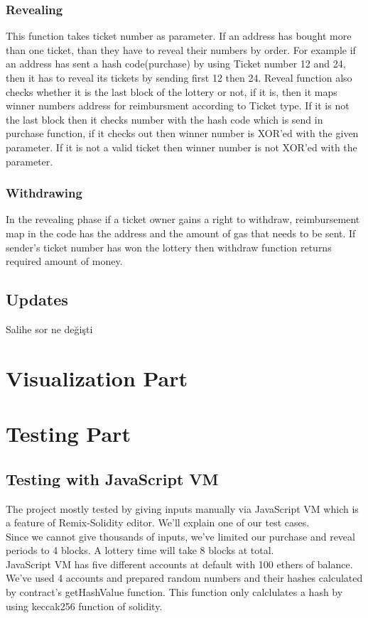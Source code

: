 \documentclass[]{scrreprt}
\begin{document}
		\subsection{Revealing}
		This function takes ticket number as parameter. If an address has bought more than one ticket, than they have to reveal their numbers by order. For example if an address has sent a hash code(purchase) by using Ticket number 12 and 24, then it has to reveal its tickets by sending first 12 then 24. Reveal function also checks whether it is the last block of the lottery or not, if it is, then it maps winner numbers address for reimbursment according to Ticket type. If it is not the last block then it checks number with the hash code which is send in purchase function, if it checks out then winner number is XOR'ed with the given parameter. If it is not a valid ticket then winner number is not XOR'ed with the parameter.
		\subsection{Withdrawing}
		In the revealing phase if a ticket owner gains a right to withdraw, reimbursement map in the code has the address and the amount of gas that needs to be sent. If sender's ticket number has won the lottery then withdraw function returns required amount of money. 
	 \section{Updates}
		Salihe sor ne değişti
	\chapter{Visualization Part}
		
	\chapter{Testing Part}
		\section{Testing with JavaScript VM}
		The project mostly tested by giving inputs manually via JavaScript VM which is a feature of Remix-Solidity editor. We'll explain one of our test cases.\\
		Since we cannot give thousands of inputs, we've limited our purchase and reveal periods to 4 blocks. A lottery time will take 8 blocks at total. \\
		JavaScript VM has five different accounts at default with 100 ethers of balance. We've used 4 accounts and prepared random numbers and their hashes calculated by contract's getHashValue function. This function only calclulates a hash by using keccak256 function of solidity.\\
\end{document}
